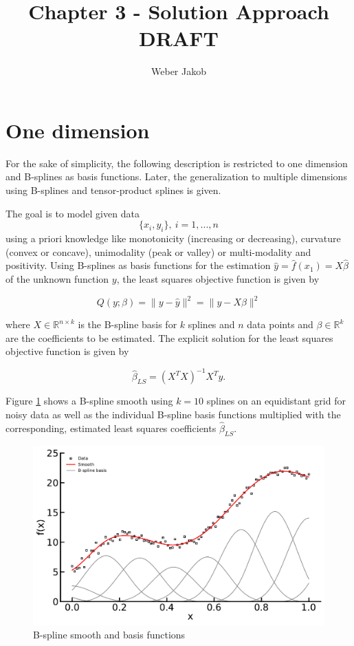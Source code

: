 \documentclass[10pt,a4paper]{article}
\title{Chapter 3 - Solution Approach DRAFT}
\author{Weber Jakob}
\begin{document}
	\maketitle
	
	\section{One dimension} \label{1D}
 	For the sake of simplicity, the following description is restricted to one dimension and B-splines as basis functions. Later, the generalization to multiple dimensions using B-splines and tensor-product splines is given. 
 
 	The goal is to model given data $$\{x_i, y_i\}, \ i = 1, ..., n$$ using a priori knowledge like monotonicity (increasing or decreasing), curvature (convex or concave), unimodality (peak or valley) or multi-modality and positivity. Using B-splines as basis functions for the estimation $\hat y =  \hat f(x_1) = X\hat \beta$ of the unknown function $y$, the least squares objective function is given by
	
	$$Q(y;\beta) = \lVert y - \hat y\rVert^2 = \lVert y - X\beta\rVert^2 $$
	
	where $X \in \mathbb{R}^{n \times k}$ is the B-spline basis for $k$ splines and $n$ data points and $\beta \in \mathbb{R}^k$ are the coefficients to be estimated. The explicit solution for the least squares objective function is given by
	
	$$\hat \beta_{LS}= (X^TX)^{-1}X^T y.$$
	
	Figure \ref{fig:smooth_bf} shows a B-spline smooth using $k=10$ splines on an equidistant grid for noisy data as well as the individual B-spline basis functions multiplied with the corresponding, estimated least squares coefficients $\hat \beta_{LS}$.
	
	\begin{figure}[H]
		\centering
		\includegraphics[width=\columnwidth]{../thesisplots/smooth_bf.pdf}
		\caption{B-spline smooth and basis functions}
		\label{fig:smooth_bf}
    \end{figure}
	
\end{document}
